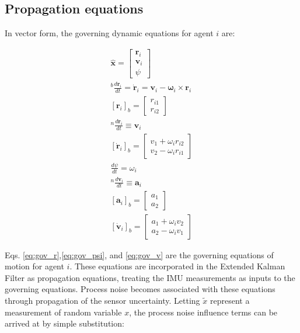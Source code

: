 \documentclass{aiaa-tc}
\newcommand{\br}[2]{[#1]_{#2}} %
\newcommand{\B}[1]{\textbf{#1}} %
\newcommand{\BG}[1]{{\bm #1}}           %
\newcommand{\ddt}[1]{\frac{d#1}{dt}} %
\begin{document}
\subsection{Propagation equations}

In vector form, the governing dynamic equations for agent $i$ are:

\begin{align}
\hat{\B{x}} = \begin{bmatrix}
\B{r}_i \\
\B{v}_i \\
\psi
\end{bmatrix}\\
{}^b \ddt{\B{r}_i} = \dot{\B{r}}_{i} = \B{v}_i - \BG{\omega}_i \times \B{r}_i \\
\br{\B{r}_i}{b} = \begin{bmatrix}
r_{i1}\\
r_{i2}
\end{bmatrix} \label{eq:gov_r} \\
{}^n \ddt{\B{r}_i} \equiv \B{v}_i \\
\br{\dot{\B{r}}_i}{b} = \begin{bmatrix}
v_1 + \omega_i r_{i2} \\
v_2 - \omega_i r_{i1}
\end{bmatrix} \\
\ddt{\psi} = \omega_i \label{eq:gov_psi} \\
{}^n \ddt{\B{v}_i} \equiv \B{a}_i \\
\br{\B{a}_i}{b} = \begin{bmatrix}
a_1 \\a_2
\end{bmatrix} \\
\br{\dot{\B{v}}_i}{b} = \begin{bmatrix}
a_1 + \omega_i v_{2} \\
a_2 - \omega_i v_1
\end{bmatrix} \label{eq:gov_v}
\end{align}

Eqs. \ref{eq:gov_r},\ref{eq:gov_psi}, and \ref{eq:gov_v} are the governing equations of motion for agent $i$. These equations are incorporated in the Extended Kalman Filter as propagation equations, treating the IMU measurements as inputs to the governing equations. Process noise becomes associated with these equations through propagation of the sensor uncertainty. Letting $\tilde{x}$ represent a measurement of random variable $x$, the process noise influence terms can be arrived at by simple substitution:
\end{document}
